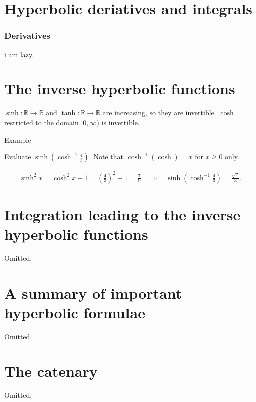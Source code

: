 \documentclass{report}
\begin{document}
	\section{Hyperbolic deriatives and integrals}
	
	\subsubsection{Derivatives}
	
	i am lazy.

	\section{The inverse hyperbolic functions}

	$\sinh: \mathbb{R} \to \mathbb{R}$ and $\tanh: \mathbb{R} \to \mathbb{R}$ are increasing, so they are invertible. $\cosh$ restricted to the domain $[0,\infty)$ is invertible.

	\begin{question}{Example}

		Evaluate $\sinh\left(\cosh^{-1} \frac{4}{3}\right)$. Note that $\cosh^{-1}(\cosh) = x$ for $x \geq 0$ only.

		\begin{align*}
			\sinh^2 x = \cosh^2 x - 1 = \left(\frac{4}{3}\right)^2 - 1 = \frac{7}{9} \quad \Rightarrow \quad \sinh \left(\cosh^{-1} \frac{4}{3} \right) = \frac{\sqrt{7}}{3}.
		\end{align*}
		
	\end{question}

	\section{Integration leading to the inverse hyperbolic functions}

	Omitted.

	\section{A summary of important hyperbolic formulae}

	Omitted.

	\section{The catenary}

	Omitted.
\end{document}
